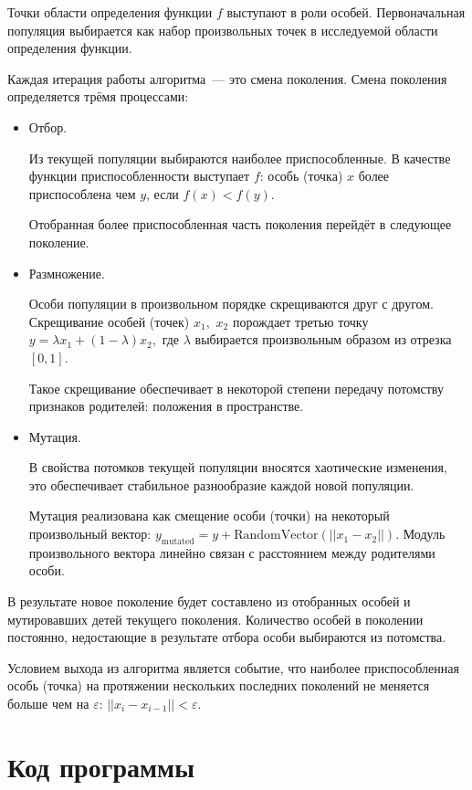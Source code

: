 \documentclass[10pt,a4paper,titlepage]{article}
\begin{document}
Точки области определения функции $f$ выступают в роли особей. 
Первоначальная популяция выбирается как набор произвольных точек в исследуемой области определения функции.

Каждая итерация работы алгоритма~--- это смена поколения. 
Смена поколения определяется трёмя процессами:
\begin{itemize}
  \item Отбор. 
  
    Из текущей популяции выбираются наиболее приспособленные.
    В качестве функции приспособленности выступает $f$: особь (точка) $x$ более приспособлена чем $y$, 
    если $f(x) < f(y)$.
  
    Отобранная более приспособленная часть поколения перейдёт в следующее поколение.
  \item Размножение. 
  
    Особи популяции в произвольном порядке скрещиваются друг с другом.
    Скрещивание особей (точек) $x_1,$ $x_2$ порождает третью точку $y = \lambda x_1 + (1 - \lambda) x_2,$
    где $\lambda$ выбирается произвольным образом из отрезка $[0, 1]$.
    
    Такое скрещивание обеспечивает в некоторой степени передачу потомству признаков родителей: 
    положения в пространстве.
    
  \item Мутация.
  
    В свойства потомков текущей популяции вносятся хаотические изменения, 
    это обеспечивает стабильное разнообразие каждой новой популяции.
    
    Мутация реализована как смещение особи (точки) на некоторый произвольный вектор:
    $y_{\textrm{mutated}} = y + \textrm{RandomVector}(||x_1 - x_2||).$ 
    Модуль произвольного вектора линейно связан с расстоянием между родителями особи.
\end{itemize}

В результате новое поколение будет составлено из отобранных особей и мутировавших детей текущего поколения. 
Количество особей в поколении постоянно, недостающие в результате отбора особи выбираются из потомства.

Условием выхода из алгоритма является событие, что наиболее приспособленная особь (точка) на протяжении нескольких последних
поколений не меняется больше чем на $\varepsilon$: $||x_i - x_{i-1}|| < \varepsilon$.

\section{Код программы}
\end{document}
